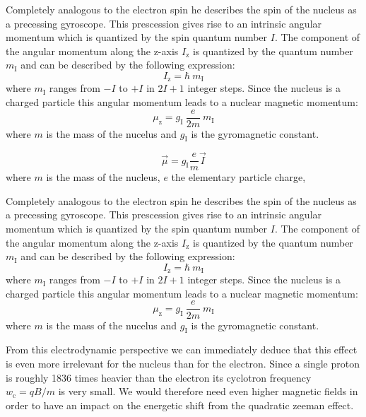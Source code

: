 \documentclass{article}
\begin{document}
Completely analogous to the electron spin he describes the spin of the nucleus as a precessing gyroscope. This prescession gives rise to an intrinsic angular momentum which is quantized by the spin quantum number $I$. The component of the angular momentum along the z-axis $I_{\mathrm{z}}$ is quantized by the quantum number $m_{\mathrm{I}}$ and can be described by the following expression:
\begin{equation}
    I_{\mathrm{z}}=\hbar \ m_{\mathrm{I}}
\end{equation}
where $m_{\mathrm{I}}$ ranges from $-I$ to $+I$ in $2I+1$ integer steps. Since the nucleus is a charged particle this angular momentum leads to a nuclear magnetic momentum:
\begin{equation}
    \mu_{\mathrm{z}}=g_{\mathrm{I}}\ \dfrac{e}{2m} \ m_{\mathrm{I}}
\end{equation}
where $m$ is the mass of the nucelus and $g_{\mathrm{I}}$ is the gyromagnetic constant.


\begin{equation}
    \Vec{\mu}=g_{\mathrm{I}} \dfrac{e}{m} \Vec{I}
\end{equation}
where $m$ is the mass of the nucleus, $e$ the elementary particle charge, 


Completely analogous to the electron spin he describes the spin of the nucleus as a precessing gyroscope. This prescession gives rise to an intrinsic angular momentum which is quantized by the spin quantum number $I$. The component of the angular momentum along the z-axis $I_{\mathrm{z}}$ is quantized by the quantum number $m_{\mathrm{I}}$ and can be described by the following expression:
\begin{equation}
    I_{\mathrm{z}}=\hbar \ m_{\mathrm{I}}
\end{equation}
where $m_{\mathrm{I}}$ ranges from $-I$ to $+I$ in $2I+1$ integer steps. Since the nucleus is a charged particle this angular momentum leads to a nuclear magnetic momentum:
\begin{equation}
    \mu_{\mathrm{z}}=g_{\mathrm{I}}\ \dfrac{e}{2m} \ m_{\mathrm{I}}
\end{equation}
where $m$ is the mass of the nucelus and $g_{\mathrm{I}}$ is the gyromagnetic constant.

From this electrodynamic perspective we can immediately deduce that this effect is even more irrelevant for the nucleus than for the electron. Since a single proton is roughly 1836 times heavier than the electron its cyclotron frequency $w_{\mathrm{c}}=qB/m$ is very small. We would therefore need even higher magnetic fields in order to have an impact on the energetic shift from the quadratic zeeman effect.
\end{document}
